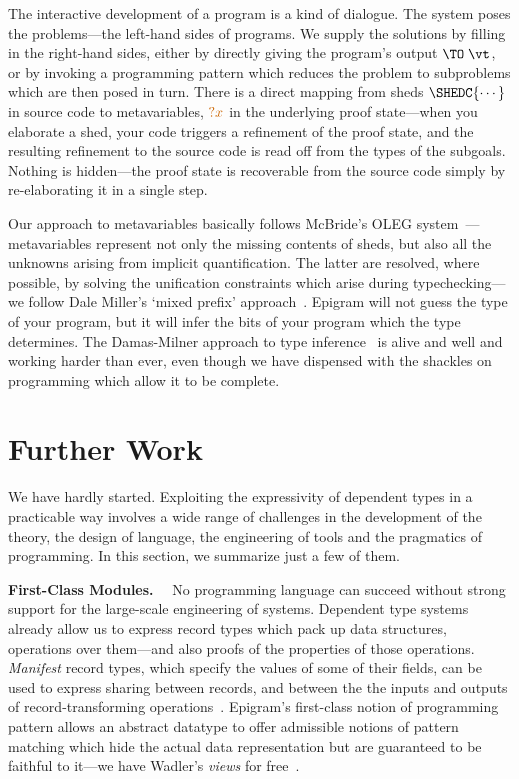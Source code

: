 \documentclass{fundam}
\begin{document}
The interactive development of a program is a kind of dialogue.  The
system poses the problems---the left-hand sides of programs.  We
supply the solutions by filling in the right-hand sides, either by
directly giving the program's output $\TO\;\vt$, or by invoking a
programming pattern which reduces the problem to subproblems which are
then posed in turn. There is a direct mapping from sheds
$\SHEDC{\cdots}$ in source code to metavariables, $\orange{?x}$ in the
underlying proof state---when you elaborate a shed, your code triggers
a refinement of the proof state, and the resulting refinement to the
source code is read off from the types of the subgoals. Nothing is
hidden---the proof state is recoverable from the source code simply by
re-elaborating it in a single step.

Our approach to metavariables basically follows McBride's OLEG
system~\cite{conor-phd}---metavariables represent not only the missing
contents of sheds, but also all the unknowns arising from implicit
quantification. The latter are resolved, where possible, by solving
the unification constraints which arise during typechecking---we
follow Dale Miller's `mixed prefix'
approach~\cite{miller:mixed}. Epigram will not guess the type of your
program, but it will infer the bits of your program which the type
determines. The Damas-Milner approach to type
inference~\cite{damas.milner:principal} is alive and well and working
harder than ever, even though we have dispensed with the shackles on
programming which allow it to be complete.


\section{Further Work}
\label{sec:further}

We have hardly started. Exploiting
the expressivity of dependent types in a practicable way involves
a wide range of challenges in the development of the theory, the
design of language, the engineering of tools and the pragmatics of
programming. In this section, we summarize just a few of them.

\textbf{First-Class Modules.}$\quad$ No programming language can succeed
without strong support for the large-scale engineering of
systems. Dependent type systems already allow us to express record
types which pack up data structures, operations over them---and also
proofs of the properties of those operations. \emph{Manifest} record
types, which specify the values of some of their fields, can be used
to express sharing between records, and between the the inputs and
outputs of record-transforming operations~\cite{pollack:records}.
Epigram's first-class notion of programming pattern allows an abstract
datatype to offer admissible notions of pattern matching which hide
the actual data representation but are guaranteed to be faithful to
it---we have Wadler's \emph{views} for free~\cite{wadler:views}.
\end{document}
